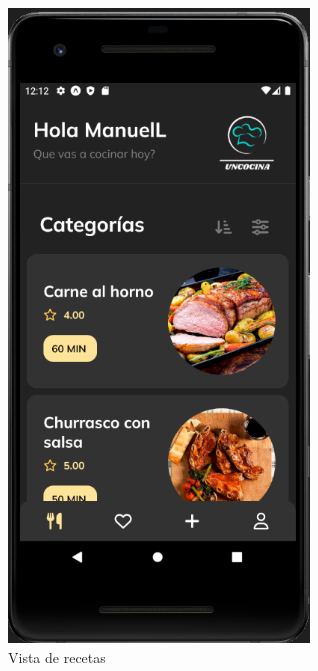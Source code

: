 \begin{figure}[!h]
  \centering
  \includegraphics[width=8cm, scale=1]{Images/Imagenes/recetas1.png}
  \caption{Vista de recetas}
  \label{fig:recetas1}
\end{figure}

